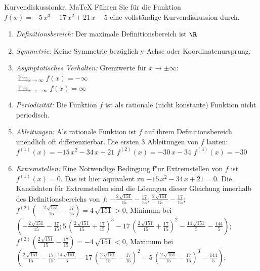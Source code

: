  \providecommand{\MoIl}{(} 
 \providecommand{\MoIr}{)}
 \providecommand{\MIntvlSep}{;} 
 \providecommand{\MElSetSep}{;} 
 \begin{MAufgabe}{Kurvendiskussion}{kr, MaTeX}
 F\"uhren Sie f\"ur die Funktion $f(x)= - 5\, x^3 - 17\, x^2 + 21\, x - 5$ eine vollst\"andige Kurvendiskussion durch.\\ 
 \ifLsg\Loesung
 \begin{enumerate}
 \item \emph{Definitionsbereich:} 
 Der maximale Definitionsbereich ist $\R$\item \emph{Symmetrie:} 
 Keine Symmetrie bez\"uglich y-Achse oder Koordinatenursprung.\item \emph{Asymptotisches Verhalten:} 
 Grenzwerte f\"ur $x\rightarrow \pm \infty$: \\ 
 $\lim_{x\rightarrow \infty} f(x)=- \infty$ \\ 
 $\lim_{x\rightarrow -\infty} f(x)=\infty$ \\ 
 \item \emph{Periodizit\"at:} 
 Die Funktion $f$ ist als rationale (nicht konstante) Funktion nicht periodisch.\item \emph{Ableitungen:} 
 Als rationale Funktion ist $f$ auf ihrem Definitionsbereich unendlich oft differenzierbar. 
 Die ersten 3 Ableitungen von $f$ lauten: \\ 
 $f^{(1)}(x)= - 15\, x^2 - 34\, x + 21$\newline 
  $f^{(2)}(x)= - 30\, x - 34$\newline 
  $f^{(3)}(x)=-30$\newline 
  \item \emph{Extremstellen:} 
 Eine Notwendige Bedingung f"ur Extremstellen von $f$ ist $f^{(1)}(x)=0$. 
 Das ist hier \"aquivalent zu $ - 15\, x^2 - 34\, x + 21=0$. 
 Die Kandidaten f\"ur Extremstellen sind die L\"osungen dieser Gleichung innerhalb des Definitionsbereichs von $f$: $ - \frac{2\, \sqrt{151}}{15} - \frac{17}{15}$; $\frac{2\, \sqrt{151}}{15} - \frac{17}{15}$; \\ 
 $f^{(2)}( - \frac{2\, \sqrt{151}}{15} - \frac{17}{15})=4\, \sqrt{151}$$>0$, Minimum bei $( - \frac{2\, \sqrt{151}}{15} - \frac{17}{15};5\, {\left(\frac{2\, \sqrt{151}}{15} + \frac{17}{15}\right)}^3 - 17\, {\left(\frac{2\, \sqrt{151}}{15} + \frac{17}{15}\right)}^2 - \frac{14\, \sqrt{151}}{5} - \frac{144}{5})$; \\ 
 $f^{(2)}(\frac{2\, \sqrt{151}}{15} - \frac{17}{15})=- 4\, \sqrt{151}$$<0$, Maximum bei $(\frac{2\, \sqrt{151}}{15} - \frac{17}{15};\frac{14\, \sqrt{151}}{5} - 17\, {\left(\frac{2\, \sqrt{151}}{15} - \frac{17}{15}\right)}^2 - 5\, {\left(\frac{2\, \sqrt{151}}{15} - \frac{17}{15}\right)}^3 - \frac{144}{5})$; \\ 

\end{enumerate}
\end{MAufgabe}
